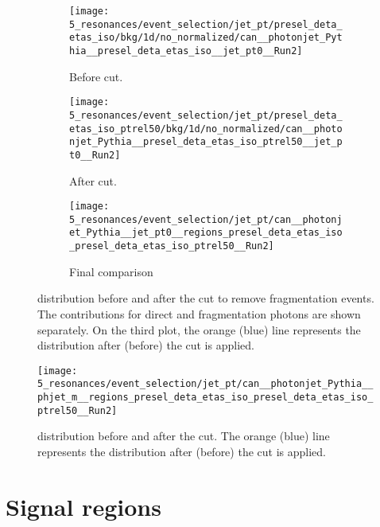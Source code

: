 \begin{figure}[ht!]
    \centering
    \begin{subfigure}[h]{0.32\linewidth}
        \centering
        \texttt{[image: 5\_resonances/event\_selection/jet\_pt/presel\_deta\_etas\_iso/bkg/1d/no\_normalized/can\_\_photonjet\_Pythia\_\_presel\_deta\_etas\_iso\_\_jet\_pt0\_\_Run2]}
        \caption{Before \ptjet cut.}
    \end{subfigure}
    \hfill
    \begin{subfigure}[h]{0.32\linewidth}
        \centering
        \texttt{[image: 5\_resonances/event\_selection/jet\_pt/presel\_deta\_etas\_iso\_ptrel50/bkg/1d/no\_normalized/can\_\_photonjet\_Pythia\_\_presel\_deta\_etas\_iso\_ptrel50\_\_jet\_pt0\_\_Run2]}
        \caption{After \ptjet cut.}
    \end{subfigure}
    \hfill
    \begin{subfigure}[h]{0.32\linewidth}
        \centering
        \texttt{[image: 5\_resonances/event\_selection/jet\_pt/can\_\_photonjet\_Pythia\_\_jet\_pt0\_\_regions\_presel\_deta\_etas\_iso\_presel\_deta\_etas\_iso\_ptrel50\_\_Run2]}
        \caption{Final comparison}
    \end{subfigure}
    \caption{\ptjet distribution before and after the cut to remove fragmentation events. The contributions for direct and fragmentation photons are shown separately. On the third plot, the orange (blue) line represents the distribution after (before) the cut is applied.}
    \label{fig:evt_selection:sr_opt:jet_pt:jet_pt}
\end{figure}



\begin{figure}[ht!]
    \centering
    \texttt{[image: 5\_resonances/event\_selection/jet\_pt/can\_\_photonjet\_Pythia\_\_phjet\_m\_\_regions\_presel\_deta\_etas\_iso\_presel\_deta\_etas\_iso\_ptrel50\_\_Run2]}
    \caption{\myj distribution before and after the \ptjet cut. The orange (blue) line represents the distribution after (before) the cut is applied.}
    \label{fig:evt_selection:sr_opt:jet_pt:phjet_m}
\end{figure}















\section{Signal regions}
\label{sec:evt_selection:sr}


